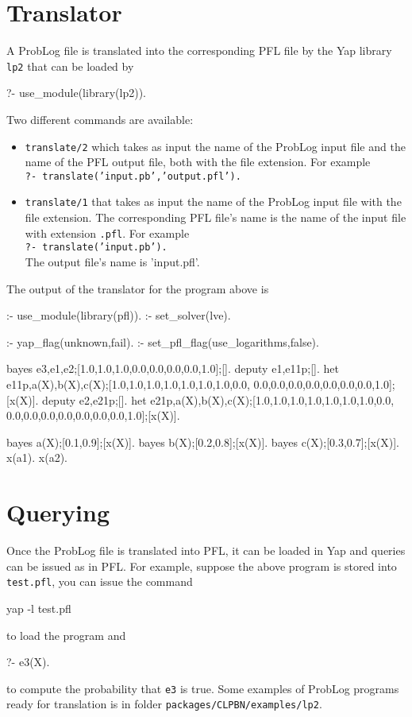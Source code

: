 \documentclass{article}
\begin{document}
\section{Translator}
A ProbLog file is translated into the corresponding PFL file by the Yap library \verb|lp2| that can be loaded by
\begin{pflcode}
?- use_module(library(lp2)).
\end{pflcode}
Two different commands are available:
\begin{itemize}
 \item \texttt{translate/2} which takes as input the name of the ProbLog input file and the name of the PFL output file, both with the file extension.
For example\\
\texttt{?- translate('input.pb','output.pfl').}

\item \texttt{translate/1} that takes as input the name of the ProbLog input file with the file extension. The corresponding PFL file's name is the name of the input file with extension \verb|.pfl|.
For example\\
\texttt{?- translate('input.pb').}\\
\noindent The output file's name is 'input.pfl'.

\end{itemize}

The output of the translator for the program above is
\begin{pflcode}
:- use_module(library(pfl)).
:- set_solver(lve).

:- yap_flag(unknown,fail).
:- set_pfl_flag(use_logarithms,false).


bayes e3,e1,e2;[1.0,1.0,1.0,0.0,0.0,0.0,0.0,1.0];[].
deputy e1,e11p;[].
het e11p,a(X),b(X),c(X);[1.0,1.0,1.0,1.0,1.0,1.0,1.0,0.0,
                         0.0,0.0,0.0,0.0,0.0,0.0,0.0,1.0];[x(X)].
deputy e2,e21p;[].
het e21p,a(X),b(X),c(X);[1.0,1.0,1.0,1.0,1.0,1.0,1.0,0.0,
                         0.0,0.0,0.0,0.0,0.0,0.0,0.0,1.0];[x(X)].

bayes a(X);[0.1,0.9];[x(X)].
bayes b(X);[0.2,0.8];[x(X)].
bayes c(X);[0.3,0.7];[x(X)].
x(a1).
x(a2).
\end{pflcode}

\section{Querying}
Once the ProbLog file is translated into PFL, it can be loaded in Yap and queries can be issued as in PFL.
For example, suppose the above program is stored into \verb|test.pfl|, you can issue the command
\begin{pflcode}
yap -l test.pfl
\end{pflcode}
to load the program and 
\begin{pflcode}
?- e3(X).
\end{pflcode}
to compute the probability that \verb|e3| is true.
Some examples of ProbLog programs ready for translation is in folder \verb|packages/CLPBN/examples/lp2|.
\end{document}
